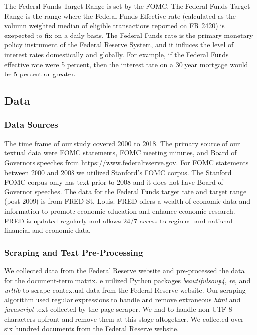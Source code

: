 \documentclass[11pt]{article}
\newcommand{\vertSpace}[1]{\vspace{3mm}}
\begin{document}
{The Federal Funds Target Range is set by the FOMC.  The Federal Funds Target Range is the range where the Federal Funds Effective rate (calculated as the volumn weighted median of eligible transactions reported on FR 2420) is exepected to fix on a daily basis.  The Federal Funds rate is the primary monetary policy instrument of the Federal Reserve System, and it influces the level of interest rates domestically and globally.  For example, if the Federal Funds effective rate were 5 percent, then the interest rate on a 30 year mortgage would be 5 percent or greater.  

\subsection{Data}

\subsubsection{Data Sources}
The time frame of our study covered 2000 to 2018.  
The primary source of our textual data were FOMC statements, FOMC meeting minutes, and Board of Governors speeches from \url{https://www.federalreserve.gov}.  
For FOMC statements between 2000 and 2008 we utilized Stanford's FOMC corpus.  
The Stanford FOMC corpus only has text prior to 2008 and it does not have Board of Governor speeches.
The data for the Federal Funds target rate and target range (post 2009) is from FRED St. Louis.  
FRED offers a wealth of economic data and information to promote economic education and enhance economic research. 
FRED is updated regularly and allows 24/7 access to regional and national financial and economic data.


\subsubsection{Scraping and Text Pre-Processing}

We collected data from the Federal Reserve website and pre-processed the data for the document-term matrix. \vertSpace


We utilized Python packages \textit{beautifulsoup4}, \textit{re}, and \textit{urllib} to scrape contextual data from the Federal Reserve website.  Our scraping algorithm used regular expressions to handle and remove extraneous \textit{html} and \textit{javascript} text collected by the page scraper.  We had to handle non UTF-8 characters upfront and remove them at this stage altogether.  We collected over six hundred documents from the Federal Reserve website. \vertSpace


}
\end{document}
